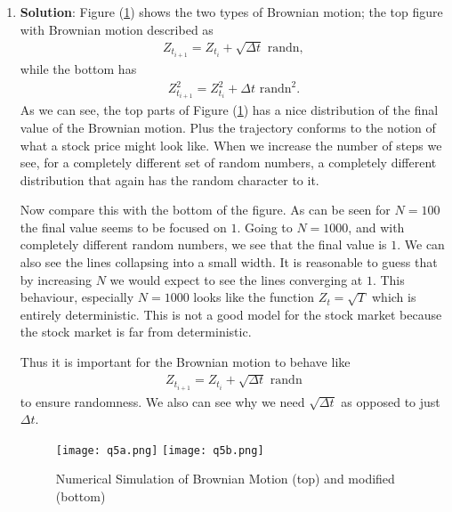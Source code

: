 \documentclass[10pt,english]{article}
\theoremstyle{plain}
\newcommand{\dt}{\Delta t}
\begin{document}
\begin{enumerate}
\item \textbf{Solution}: Figure (\ref{bm1})  shows the two types of Brownian motion; the top figure with Brownian motion described as
\begin{align*}
Z_{t_{i+1}}= Z_{t_{i}} + \sqrt{\dt}\text{ randn},
\end{align*}
while the bottom has
\begin{align*}
Z_{t_{i+1}}^2= Z_{t_{i}}^2 +\dt\text{ randn}^2.
\end{align*}
As we can see, the top parts of Figure (\ref{bm1}) has a nice distribution of the final value of the Brownian motion. Plus the trajectory conforms to the notion of what a stock price might look like. When we increase the number of steps we see, for a completely different set of random numbers, a completely different distribution that again has the random character to it. 

Now compare this with the bottom of the figure. As can be seen for $N=100$ the final value seems to be focused on $1$. Going to $N=1000$, and with completely different random numbers, we see that the final value is $1$. We can also see the lines collapsing into a small width. It is reasonable to guess that by increasing $N$ we would expect to see the lines converging at $1$. This behaviour, especially $N=1000$ looks like the function $Z_{t}=\sqrt{T}$ which is entirely deterministic. This is not a good model for the stock market because the stock market is far from deterministic.

Thus it is important for the Brownian motion to behave like
\begin{align*}
Z_{t_{i+1}}= Z_{t_{i}} + \sqrt{\dt}\text{ randn}
\end{align*}
to ensure randomness. We also can see why we need $\sqrt{\dt}$ as opposed to just $\dt$.

\begin{figure}

\begin{center}
\texttt{[image: q5a.png]}
\texttt{[image: q5b.png]}
\end{center}
\caption{Numerical Simulation of Brownian Motion (top) and modified (bottom)}\label{bm1}
\end{figure}
\end{enumerate}
\end{document}
